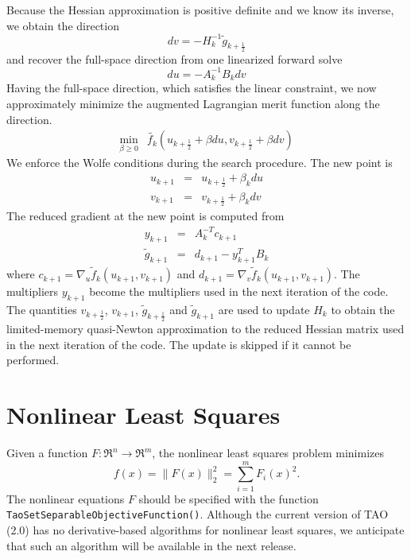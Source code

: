 Because the Hessian approximation is positive definite and we know its
inverse, we obtain the direction
\[
  dv = -H_k^{-1} \tilde{g}_{k+\frac{1}{2}}
\]
and recover the full-space direction from one linearized forward solve
\[
  du = -A_k^{-1} B_k dv
\]
Having the full-space direction, which satisfies the linear constraint, 
we now approximately minimize the augmented Lagrangian merit function 
along the direction.
\[
\begin{array}{lcl}
\displaystyle \min_{\beta \geq 0} & \tilde{f_k}(u_{k+\frac{1}{2}} + \beta du, v_{k+\frac{1}{2}} + \beta dv)
\end{array}
\]
We enforce the Wolfe conditions during the search procedure.  The new point
is
\[
\begin{array}{lcl}
u_{k+1} & = & u_{k+\frac{1}{2}} + \beta_k du \\
v_{k+1} & = & v_{k+\frac{1}{2}} + \beta_k dv
\end{array}
\]
The reduced gradient at the new point is computed from
\[
\begin{array}{lcl}
y_{k+1} & = & A_k^{-T}c_{k+1} \\
\tilde{g}_{k+1} & = & d_{k+1} - y_{k+1}^T B_k
\end{array}
\]
where $c_{k+1} = \nabla_u \tilde{f}_k (u_{k+1},v_{k+1})$ and
$d_{k+1} = \nabla_v \tilde{f}_k (u_{k+1},v_{k+1})$.  The
multipliers $y_{k+1}$ become the multipliers used in the
next iteration of the code.  The quantities $v_{k+\frac{1}{2}}$,
$v_{k+1}$, $\tilde{g}_{k+\frac{1}{2}}$ and $\tilde{g}_{k+1}$ are
used to update $H_k$ to obtain the limited-memory quasi-Newton
approximation to the reduced Hessian matrix used in the next
iteration of the code.  The update is skipped if it cannot be
performed.

\section{Nonlinear Least Squares}
\label{sec:leastsquares}
Given a function $F  : \Re^n \to \Re^m$, the nonlinear least
squares problem minimizes 
\begin{equation} 
 f(x)= \| F(x) \|_2^2 = \sum_{i=1}^m F_i(x)^2.
 \label{eq:nlsf}
\end{equation}
The nonlinear equations $F$ should be specified with the function
{\tt Tao\-Set\-Separ\-able\-Objective\-Function()}.
Although the current version of TAO (2.0) has no derivative-based
algorithms for nonlinear least squares, we anticipate that such an
algorithm will be available in the next release. 

